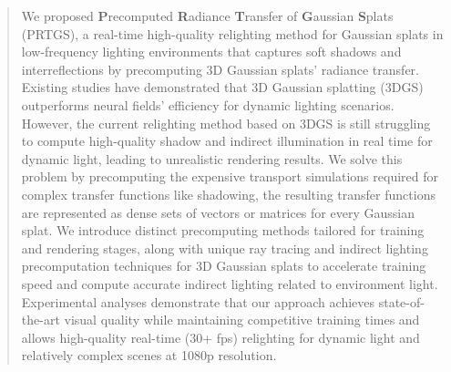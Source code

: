 \newcommand{\hupar}[1]{\vspace{12pt} \noindent \textbf{#1}\quad}
\begin{abstract}
We proposed \textbf{P}recomputed \textbf{R}adiance \textbf{T}ransfer of \textbf{G}aussian \textbf{S}plats (PRTGS), a real-time high-quality relighting method for Gaussian splats in low-frequency lighting environments that captures soft shadows and interreflections by precomputing 3D Gaussian splats' radiance transfer. Existing studies have demonstrated that 3D Gaussian splatting (3DGS) outperforms neural fields' 
 efficiency for dynamic lighting scenarios. However, the current relighting method based on 3DGS is still struggling to compute high-quality shadow and indirect illumination in real time for dynamic light, leading to unrealistic rendering results. We solve this problem by precomputing the expensive transport simulations required for complex transfer functions like shadowing, the resulting transfer functions are represented as dense sets of vectors or matrices for every Gaussian splat. We introduce distinct precomputing methods tailored for training and rendering stages, along with unique ray tracing and indirect lighting precomputation techniques for 3D Gaussian splats to accelerate training speed and compute accurate indirect lighting related to environment light. Experimental analyses demonstrate that our approach achieves state-of-the-art visual quality while maintaining competitive training times and allows high-quality real-time (30+ fps) relighting for dynamic light and relatively complex scenes at 1080p resolution.
\end{abstract}

